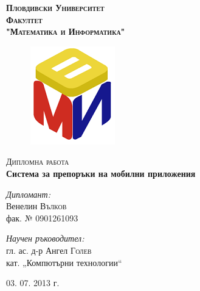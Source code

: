 
\begin{titlepage}

\begin{center}

\textsc{\huge \bfseries Пловдивски Университет}\\[1.0cm]
\textsc{\LARGE \bfseries Факултет \\"Математика и Информатика"}\\[1.5cm]

\begin{figure}[htb]
	\centering
	\includegraphics[scale=0.8]{assets/fmi-logo.png}
\end{figure}

\textsc{\Large Дипломна работа}\\[1.5cm]

{ \huge \bfseries Система за препоръки на мобилни приложения}\\[2.0cm]

\begin{minipage}{0.4\textwidth}
\begin{flushleft} \large
\emph{Дипломант:}\\
Венелин \textsc{Вълков} \\
\small
фак. № 0901261093
\end{flushleft}
\end{minipage}
\begin{minipage}{0.4\textwidth}
\begin{flushright} \large
\emph{Научен ръководител:} \\
гл. ас. д-р Ангел \textsc{Голев} \\
\small
кат. \nolinebreak[4] „Компютърни \nolinebreak[4] технологии“ 
\end{flushright}
\end{minipage}

\vfill

{\large 03. 07. 2013 г.}

\end{center}

\end{titlepage}